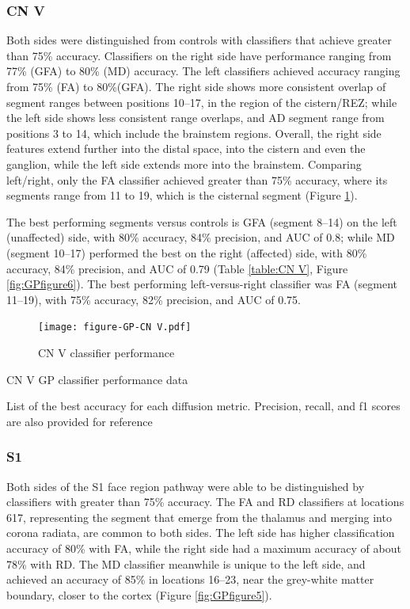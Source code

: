 \subsubsection{CN V}
Both sides were distinguished from controls with classifiers that achieve greater than 75\% accuracy. 
Classifiers on the right side have performance ranging from 77\% (GFA) to 80\% (MD) accuracy. The left classifiers achieved accuracy ranging from 75\% (FA) to 80\%(GFA). The right side shows more consistent overlap of segment ranges between positions 10--17, in the region of the cistern/REZ; while the left side shows less consistent range overlaps, and AD segment range from positions 3 to 14, which include the brainstem regions. Overall, the right side features extend further into the distal space, into the cistern and even the ganglion, while the left side extends more into the brainstem. Comparing left/right, only the FA classifier achieved greater than 75\% accuracy, where its segments range from 11 to 19, which is the cisternal segment (Figure \ref{fig:GPfigure4}). 

The best performing segments versus controls is GFA (segment 8--14) on the left (unaffected) side, with 80\% accuracy, 84\% precision, and AUC of 0.8; while MD (segment 10--17) performed the best on the right (affected) side, with 80\% accuracy, 84\% precision, and AUC of 0.79 (Table \ref{table:CN V}, Figure \ref{fig:GPfigure6}). The best performing left-versus-right classifier was FA (segment 11--19), with 75\% accuracy, 82\% precision, and AUC of 0.75.

\begin{figure}[ht]
\centering
\texttt{[image: figure-GP-CN V.pdf]}
\caption{CN V classifier performance}
\label{fig:GPfigure4}
\end{figure}

\begin{table}[ht]
\centering
{}
\caption{CN V GP classifier performance data}
\caption*{List of the best accuracy for each diffusion metric. Precision, recall, and f1 scores are also provided for reference}
\label{table:CN V}
\end{table}

\subsubsection{S1}
Both sides of the S1 face region pathway were able to be distinguished by classifiers with greater than 75\% accuracy. 
The FA and RD classifiers at locations 617, representing the segment that emerge from the thalamus and merging into corona radiata, are common to both sides. The left side has higher classification accuracy of 80\% with FA, while the right side had a maximum accuracy of about 78\% with RD. 
The MD classifier meanwhile  is unique to the left side, and achieved an accuracy of 85\% in locations 16--23, near the grey-white matter boundary, closer to the cortex (Figure \ref{fig:GPfigure5}).

